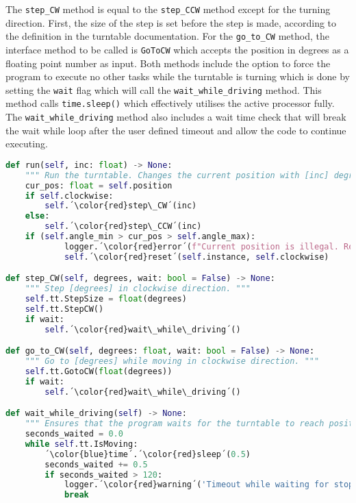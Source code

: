 The \verb+step_CW+ method is equal to the \verb+step_CCW+ method except for the turning direction. First, the size of the step is set before the step is made, according to the definition in the turntable documentation. For the \verb+go_to_CW+ method, the interface method to be called is \verb+GoToCW+ which accepts the position in degrees as a floating point number as input. Both methods include the option to force the program to execute no other tasks while the turntable is turning which is done by setting the \verb+wait+ flag which will call the \verb+wait_while_driving+ method. This method calls \verb+time.sleep()+ which effectively utilises the active processor fully. The \verb+wait_while_driving+ method also includes a wait time check that will break the wait while loop after the user defined timeout and allow the code to continue executing. 

\begin{lstlisting}[language=Python, caption=Methods for turning the turntable to the wanted position.]
def run(self, inc: float) -> None:
    """ Run the turntable. Changes the current position with [inc] degrees. """
    cur_pos: float = self.position
    if self.clockwise:
        self.´\color{red}step\_CW´(inc)
    else:
        self.´\color{red}step\_CCW´(inc)
    if (self.angle_min > cur_pos > self.angle_max):
            logger.´\color{red}error´(f"Current position is illegal. Resetting: {self.instance}")
            self.´\color{red}reset´(self.instance, self.clockwise)

def step_CW(self, degrees, wait: bool = False) -> None:
    """ Step [degrees] in clockwise direction. """
    self.tt.StepSize = float(degrees)
    self.tt.StepCW()
    if wait:
        self.´\color{red}wait\_while\_driving´()

def go_to_CW(self, degrees: float, wait: bool = False) -> None:
    """ Go to [degrees] while moving in clockwise direction. """
    self.tt.GotoCW(float(degrees))
    if wait:
        self.´\color{red}wait\_while\_driving´()

def wait_while_driving(self) -> None:
    """ Ensures that the program waits for the turntable to reach position before execution further code. """
    seconds_waited = 0.0
    while self.tt.IsMoving:
        ´\color{blue}time´.´\color{red}sleep´(0.5)
        seconds_waited += 0.5
        if seconds_waited > 120:
            logger.´\color{red}warning´('Timeout while waiting for stop.')
            break
\end{lstlisting}

